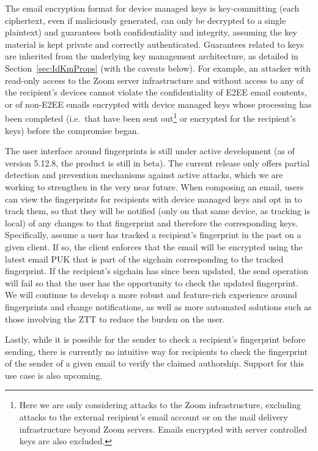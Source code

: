 The email encryption format for device managed keys is key-committing (each ciphertext, even if
maliciously generated, can only be decrypted to a single plaintext) and guarantees both
confidentiality and integrity, assuming the key material is kept private and correctly
authenticated. Guarantees related to keys are inherited from the underlying key management
architecture, as detailed in Section~\ref{sec:IdKmProps} (with the caveats below). For example, an
attacker with read-only access to the Zoom server infrastructure and without access to any of the
recipient's devices cannot violate the confidentiality of E2EE email contents, or of non-E2EE emails encrypted with device managed keys
whose processing has been completed (i.e.\ that have been sent out\footnote{Here we are only
considering attacks to the Zoom infrastructure, excluding attacks to the external recipient's email
account or on the mail delivery infrastructure beyond Zoom servers. Emails encrypted with server controlled keys are also excluded.} or encrypted for the
recipient's keys) before the compromise began.

The user interface around fingerprints is still under active development (as of version 5.12.8, the
product is still in beta). The current release only offers partial detection and prevention
mechanisms against active attacks, which we are working to strengthen in the very near future. When composing an email, users can view the fingerprints for recipients with device managed keys and opt in to track them, so that they will be notified (only on that same device, as tracking is local) of any changes to that fingerprint and therefore the corresponding keys. 
Specifically, assume a user has tracked a recipient's fingerprint in the past on a given client. If so, the client enforces that the email will be encrypted using the latest email PUK that is part of the sigchain corresponding to the tracked fingerprint. If
the recipient's sigchain has since been updated, the send operation will fail so
that the user has the opportunity to check the updated fingerprint. We will
continue to develop a more robust and feature-rich experience around fingerprints and change
notifications, as well as more automated solutions such as those involving the ZTT to reduce the
burden on the user.

Lastly, while it is possible for the sender to check a recipient's fingerprint before sending, there
is currently no intuitive way for recipients to check the fingerprint of the sender of a given email
to verify the claimed authorship. Support for this use case is also upcoming.

